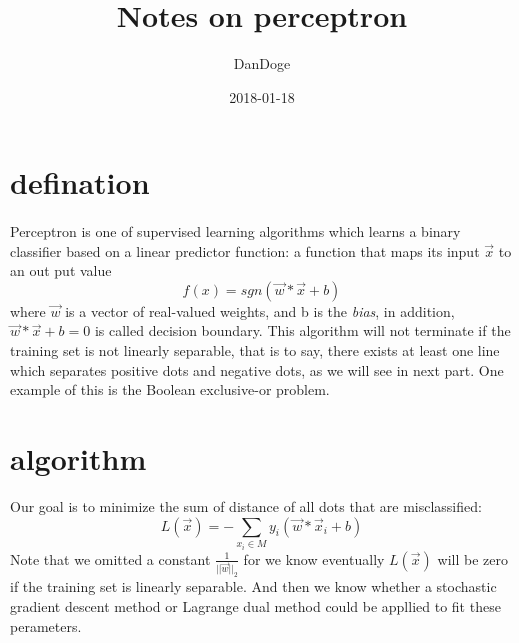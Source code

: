 \documentclass{article}
\title{Notes on perceptron}
\date{2018-01-18}
\author{DanDoge}
\begin{document}
\section{defination}
  \paragraph{}
    Perceptron is one of supervised learning algorithms which learns a  binary classifier based on a linear predictor function: a function that maps its input $\vec x$ to an out put value
  \begin{equation*}
    f(x) = sgn(\vec w * \vec x  + b)
  \end{equation*}
  where $\vec w$ is a vector of real-valued weights, and b is the \textit{bias}, in addition, $\vec w * \vec x + b = 0$ is called decision boundary. This algorithm will not terminate if the training set is not linearly separable, that is to say, there exists at least one line which separates positive dots and negative dots,  as we will see in next part. One example of this is the Boolean exclusive-or problem.

\section{algorithm}
  Our goal is to minimize the sum of distance of all dots that are misclassified:
  \begin{equation*}
    \textit{L}(\vec x) = -\sum_{x_i \in M} y_i(\vec w * \vec x_i + b)
  \end{equation*}
  Note that we omitted a constant $\frac{1}{||\vec w||_2}$ for we know eventually $\textit{L}(\vec x)$ will be zero if the training set is linearly separable. And then we know whether a stochastic gradient descent method or Lagrange dual method could be appllied to fit these perameters.
\end{document}
